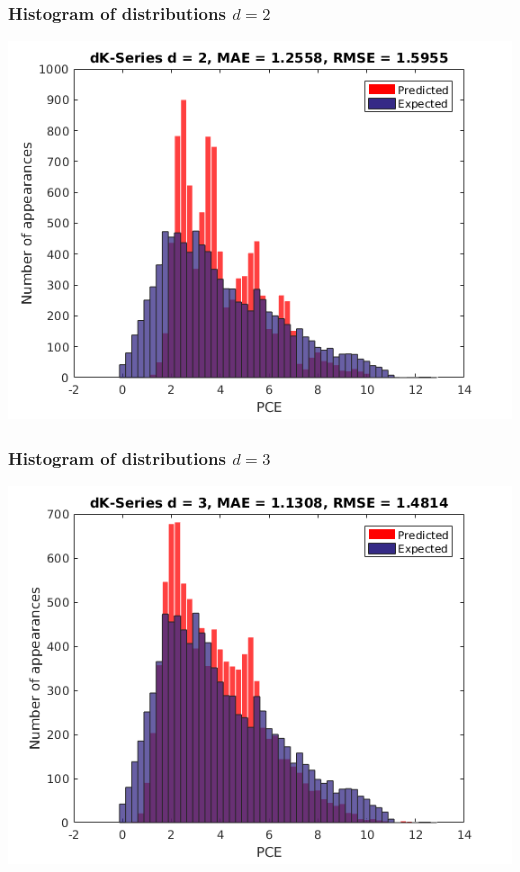 \documentclass{beamer}
\begin{document}
\begin{frame}
\frametitle{Histogram of distributions $d = 2$}
\begin{justify}
\begin{center}
	\includegraphics[scale=0.5]{d2}
\end{center}
\end{justify}
\end{frame}

\begin{frame}
\frametitle{Histogram of distributions $d = 3$}
\begin{justify}
\begin{center}
	\includegraphics[scale=0.5]{d3}
\end{center}
\end{justify}
\end{frame}
\end{document}

